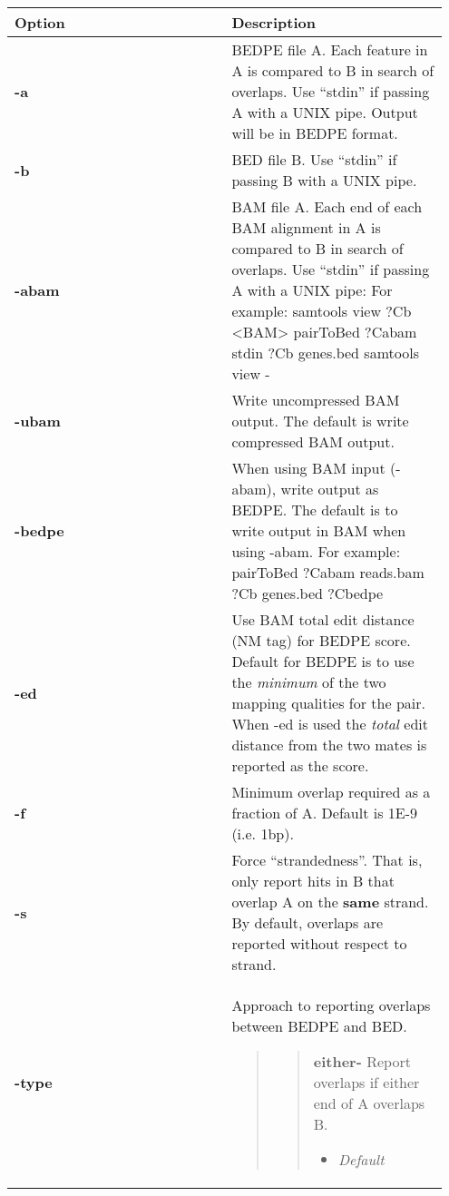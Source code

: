 \documentclass[letterpaper,10pt,english]{sphinxmanual}
\begin{document}
\begin{tabular}{|p{0.475\linewidth}|p{0.475\linewidth}|}
\hline
\textbf{
Option
} & \textbf{
Description
}\\\hline

\textbf{-a}
 & 
BEDPE file A. Each feature in A is compared to B in search of overlaps. Use ``stdin'' if passing A with a UNIX pipe. Output will be in BEDPE format.
\\\hline

\textbf{-b}
 & 
BED file B. Use ``stdin'' if passing B with a UNIX pipe.
\\\hline

\textbf{-abam}
 & 
BAM file A. Each end of each BAM alignment in A is compared to B in search of overlaps. Use ``stdin'' if passing A with a UNIX pipe: For example: samtools view ?Cb \textless{}BAM\textgreater{} \textbar{} pairToBed ?Cabam stdin ?Cb genes.bed \textbar{} samtools view -
\\\hline

\textbf{-ubam}
 & 
Write uncompressed BAM output. The default is write compressed BAM output.
\\\hline

\textbf{-bedpe}
 & 
When using BAM input (-abam), write output as BEDPE. The default is to write output in BAM when using -abam. For example: pairToBed ?Cabam reads.bam ?Cb genes.bed ?Cbedpe
\\\hline

\textbf{-ed}
 & 
Use BAM total edit distance (NM tag) for BEDPE score. Default for BEDPE is to use the \emph{minimum} of the two mapping qualities for the pair. When -ed is used the \emph{total} edit distance from the two mates is reported as the score.
\\\hline

\textbf{-f}
 & 
Minimum overlap required as a fraction of A. Default is 1E-9 (i.e. 1bp).
\\\hline

\textbf{-s}
 & 
Force ``strandedness''. That is, only report hits in B that overlap A on the \textbf{same} strand. By default, overlaps are reported without respect to strand.
\\\hline

\textbf{-type}
 & 
Approach to reporting overlaps between BEDPE and BED.
\begin{quote}
\begin{quote}

\textbf{either-} Report overlaps if either end of A overlaps B.
\begin{itemize}
\item {} 
\emph{Default}


\end{itemize}
\end{quote}
\end{quote}
\end{tabular}
\end{document}

